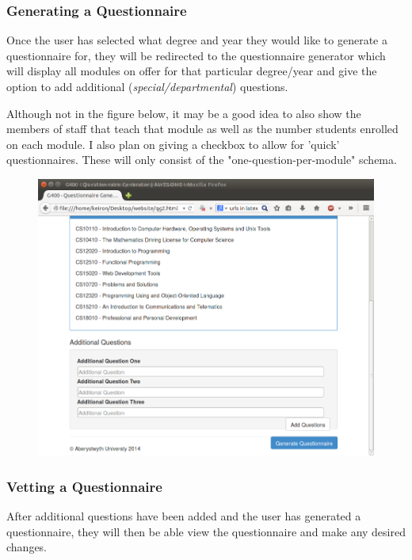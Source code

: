 \documentclass[11pt,a4paper]{article}
\begin{document}
\clearpage

\subsubsection{Generating a Questionnaire}

Once the user has selected what degree and year they would like to generate a questionnaire for, they will be redirected to the questionnaire generator which will display all modules on offer for that particular degree/year and give the option to add additional (\textit{special/departmental}) questions.

Although not in the figure below, it may be a good idea to also show the members of staff that teach that module as well as the number students enrolled on each module. I also plan on giving a checkbox to allow for 'quick' questionnaires. These will only consist of the "one-question-per-module" schema.

\begin{figure}[h]
\centering
\includegraphics[width=0.85\linewidth]{images/uidesign/generatingquestionnaire.png}
\end{figure}

\clearpage

\subsubsection{Vetting a Questionnaire}

After additional questions have been added and the user has generated a questionnaire, they will then be able view the questionnaire and make any desired changes.
\end{document}
